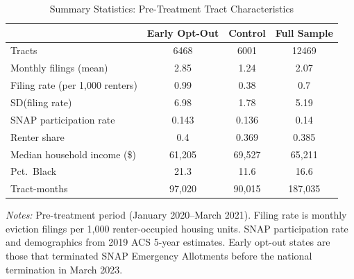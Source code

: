 \begin{table}[htbp]
\centering
\caption{Summary Statistics: Pre-Treatment Tract Characteristics}
\label{tab:summary}
\begin{tabular}{lccc}
\toprule
 & Early Opt-Out & Control & Full Sample \\
\midrule
Tracts & 6468 & 6001 & 12469 \\
Monthly filings (mean) & 2.85 & 1.24 & 2.07 \\
Filing rate (per 1,000 renters) & 0.99 & 0.38 & 0.7 \\
SD(filing rate) & 6.98 & 1.78 & 5.19 \\
SNAP participation rate & 0.143 & 0.136 & 0.14 \\
Renter share & 0.4 & 0.369 & 0.385 \\
Median household income (\$) & 61,205 & 69,527 & 65,211 \\
Pct.\ Black & 21.3 & 11.6 & 16.6 \\
Tract-months & 97,020 & 90,015 & 187,035 \\
\bottomrule
\end{tabular}
\begin{tablenotes}
\item \textit{Notes:} Pre-treatment period (January 2020--March 2021). Filing rate is monthly eviction filings per 1,000 renter-occupied housing units. SNAP participation rate and demographics from 2019 ACS 5-year estimates. Early opt-out states are those that terminated SNAP Emergency Allotments before the national termination in March 2023.
\end{tablenotes}
\end{table}

